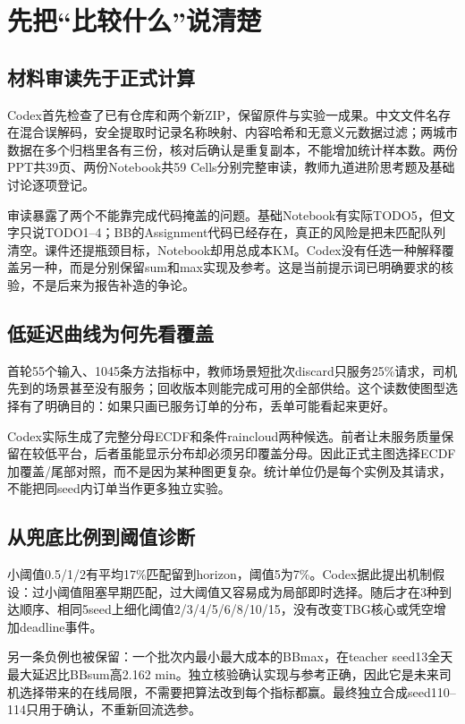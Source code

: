 \section{先把“比较什么”说清楚}
\subsection{材料审读先于正式计算}
Codex首先检查了已有仓库和两个新ZIP，保留原件与实验一成果。中文文件名存在混合误解码，安全提取时记录名称映射、内容哈希和无意义元数据过滤；两城市数据在多个归档里各有三份，核对后确认是重复副本，不能增加统计样本数。两份PPT共39页、两份Notebook共59 Cells分别完整审读，教师九道进阶思考题及基础讨论逐项登记。

审读暴露了两个不能靠完成代码掩盖的问题。基础Notebook有实际TODO5，但文字只说TODO1--4；BB的Assignment代码已经存在，真正的风险是把未匹配队列清空。课件还提瓶颈目标，Notebook却用总成本KM。Codex没有任选一种解释覆盖另一种，而是分别保留sum和max实现及参考。这是当前提示词已明确要求的核验，不是后来为报告补造的争论。

\subsection{低延迟曲线为何先看覆盖}
首轮55个输入、1045条方法指标中，教师场景短批次discard只服务25\%请求，司机先到的场景甚至没有服务；回收版本则能完成可用的全部供给。这个读数使图型选择有了明确目的：如果只画已服务订单的分布，丢单可能看起来更好。

Codex实际生成了完整分母ECDF和条件raincloud两种候选。前者让未服务质量保留在较低平台，后者虽能显示分布却必须另印覆盖分母。因此正式主图选择ECDF加覆盖/尾部对照，而不是因为某种图更复杂。统计单位仍是每个实例及其请求，不能把同seed内订单当作更多独立实验。

\subsection{从兜底比例到阈值诊断}
小阈值0.5/1/2有平均17\%匹配留到horizon，阈值5为7\%。Codex据此提出机制假设：过小阈值阻塞早期匹配，过大阈值又容易成为局部即时选择。随后才在3种到达顺序、相同5seed上细化阈值2/3/4/5/6/8/10/15，没有改变TBG核心或凭空增加deadline事件。

另一条负例也被保留：一个批次内最小最大成本的BBmax，在teacher seed13全天最大延迟比BBsum高2.162 min。独立核验确认实现与参考正确，因此它是未来司机选择带来的在线局限，不需要把算法改到每个指标都赢。最终独立合成seed110--114只用于确认，不重新回流选参。

